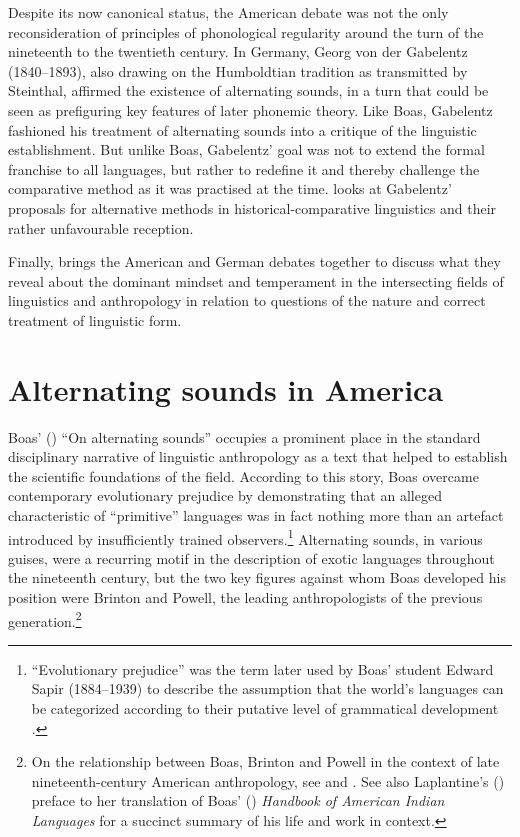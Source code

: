 \documentclass[output=paper]{langscibook}
\begin{document}
Despite its now canonical status, the American debate was not the only reconsideration of principles of phonological regularity around the turn of the nineteenth to the twentieth century. In Germany, Georg von der Gabelentz (1840--1893), also drawing on the Humboldtian tradition as transmitted by Steinthal, affirmed the existence of alternating sounds, in a turn that could be seen as prefiguring key features of later phonemic theory. Like Boas, Gabelentz fashioned his treatment of alternating sounds into a critique of the linguistic establishment. But unlike Boas, Gabelentz' goal was not to extend the formal franchise to all languages, but rather to redefine it and thereby challenge the comparative method as it was practised at the time.  looks at Gabelentz' proposals for alternative methods in historical-comparative linguistics and their rather unfavourable reception. 

Finally,  brings the American and German debates together to discuss what they reveal about the dominant mindset and temperament in the intersecting fields of linguistics and anthropology in relation to questions of the nature and correct treatment of linguistic form.

\section{Alternating sounds in America}
\label{sec:mcelvenny:america}

Boas' (\citeyear{Boas1889}) ``On alternating sounds'' occupies a prominent place in the standard disciplinary narrative of linguistic anthropology as a text that helped to establish the scientific foundations of the field. According to this story, Boas overcame contemporary evolutionary prejudice by demonstrating that an alleged characteristic of ``primitive'' languages was in fact nothing more than an artefact introduced by insufficiently trained observers.\footnote{``Evolutionary prejudice'' was the term later used by Boas' student Edward Sapir (1884--1939) to describe the assumption that the world's languages can be categorized according to their putative level of grammatical development \citep[see][130--132]{Sapir1921}.} Alternating sounds, in various guises, were a recurring motif in the description of exotic languages throughout the nineteenth century, but the two key figures against whom Boas developed his position were Brinton and Powell, the leading anthropologists of the previous generation.\footnote{On the relationship between Boas, Brinton and Powell in the context of late nineteenth-century American anthropology, see \citet{Darnell1988} and \citet{Darnell1998}. See also Laplantine's (\citeyear{Laplantine2018}) preface to her translation of Boas' (\citeyear{Boas1911}) \emph{Handbook of American Indian Languages} for a succinct summary of his life and work in context.}
\end{document}
